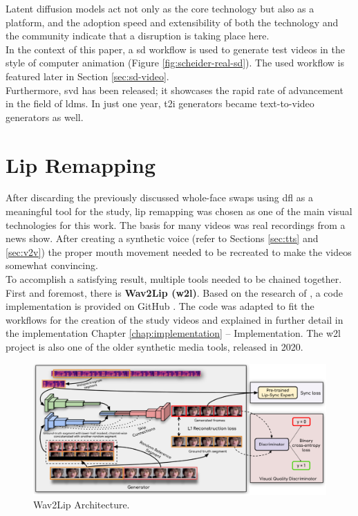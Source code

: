 \documentclass[
  a4paper,  %
  twoside,  %
  bibliography=totoc,
  headsepline,
  cleardoublepage=empty,
  parskip=half,
  draft=false
]{scrbook}
\begin{document}
Latent diffusion models act not only as the core technology but also as a platform, and the adoption speed and extensibility of both the technology and the community indicate that a disruption is taking place here. \\
In the context of this paper, a \gls{sd} workflow is used to generate test videos in the style of computer animation (Figure \ref{fig:scheider-real-sd}). The used workflow is featured later in Section \ref{sec:sd-video}. \\
Furthermore, \gls{svd} has been released; it showcases the rapid rate of advancement in the field of \gls{ldm}s. In just one year, \gls{t2i} generators became text-to-video generators as well.


\section{Lip Remapping}
\label{sec:lips}
After discarding the previously discussed whole-face swaps using \gls{dfl} as a meaningful tool for the study, lip remapping was chosen as one of the main visual technologies for this work. The basis for many videos was real recordings from a news show. After creating a synthetic voice (refer to Sections \ref{sec:tts} and \ref{sec:v2v}) the proper mouth movement needed to be recreated to make the videos somewhat convincing. \\
To accomplish a satisfying result, multiple tools needed to be chained together. First and foremost, there is \textbf{Wav2Lip (\gls{w2l})}. Based on the research of \citet{prajwalLipSyncExpert2020}, a code implementation is provided on GitHub \cite{mukhopadhyayWav2LipAccuratelyLipsyncing2023}. The code was adapted to fit the workflows for the creation of the study videos and explained in further detail in the implementation Chapter \ref{chap:implementation} – Implementation. The \gls{w2l} project is also one of the older synthetic media tools, released in 2020.

\begin{figure}[h]
  \centering
  \includegraphics[width=1\textwidth]{./graphics/w2l-arch.png}
  \caption{Wav2Lip Architecture.}
  \label{fig:wav2lip-arch}
\end{figure}
\end{document}
